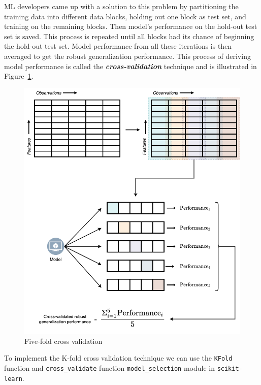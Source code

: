 \documentclass[
  letterpaper,
]{book}
\begin{document}
ML developers came up with a solution to this problem by partitioning
the training data into different data blocks, holding out one block as
test set, and training on the remaining blocks. Then model's performance
on the hold-out test set is saved. This process is repeated until all
blocks had its chance of beginning the hold-out test set. Model
performance from all these iterations is then averaged to get the robust
generalization performance. This process of deriving model performance
is called the \textbf{\emph{cross-validation}} technique and is
illustrated in Figure~\ref{fig-cross-val}.

\begin{figure}

{\centering \includegraphics{./images/cross_val.png}

}

\caption{\label{fig-cross-val}Five-fold cross validation}

\end{figure}

To implement the K-fold cross validation technique we can use the
\texttt{KFold} function and \texttt{cross\_validate} function
\texttt{model\_selection} module in \texttt{scikit-learn}.
\end{document}

